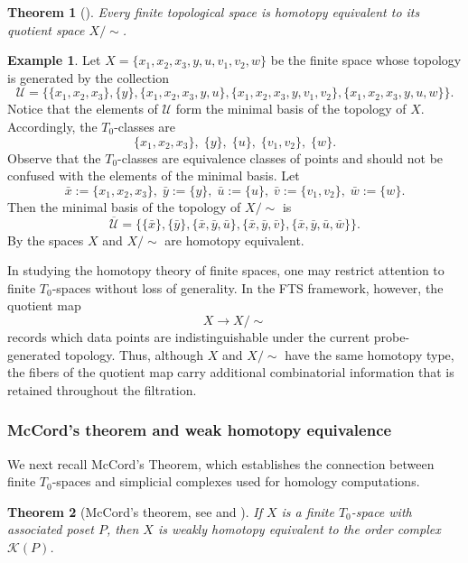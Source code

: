 \documentclass[a4paper,11pt]{article}
\newtheorem{theorem}{Theorem}[section]
\theoremstyle{definition}
\newtheorem{example}[example]{Example}
\theoremstyle{remark}
\begin{document}
\begin{theorem}[{\cite[Proposition~1.3.1]{Bar11}}]\label{thm:t0_quotient}
Every finite topological space is homotopy equivalent to its quotient space $X/{\sim}$.
\end{theorem}

\begin{example}\label{ex:t0_quotient}
  Let $X=\{x_1,x_2,x_3,y,u,v_1,v_2,w\}$ be the finite space whose topology is generated by the collection
  $$ \mathcal{U}=\{\{x_1,x_2,x_3\}, \{y\}, \{x_1,x_2,x_3,y,u\}, \{x_1,x_2,x_3,y,v_1,v_2\}, \{x_1,x_2,x_3,y,u,w\}\}. $$
  Notice that the elements of $\mathcal{U}$ form the minimal basis of the topology of $X$. Accordingly, the $T_0$-classes are
  $$ \{x_1,x_2,x_3\},\; \{y\},\; \{u\},\; \{v_1,v_2\},\; \{w\}. $$
  Observe that the $T_0$-classes are equivalence classes of points and should not be confused with the elements of the minimal basis. Let
  $$ \bar{x}:=\{x_1,x_2,x_3\},\; \bar{y}:=\{y\},\; \bar{u}:=\{u\},\; \bar{v}:=\{v_1,v_2\},\; \bar{w}:=\{w\}. $$
  Then the minimal basis of the topology of $X/{\sim}$ is
  $$ \overline{\mathcal{U}}=\{\{\bar{x}\}, \{\bar{y}\}, \{\bar{x},\bar{y},\bar{u}\}, \{\bar{x},\bar{y},\bar{v}\}, \{\bar{x},\bar{y},\bar{u},\bar{w}\}\}. $$
  By  the spaces $X$ and $X/{\sim}$ are homotopy equivalent.
\end{example}

In studying the homotopy theory of finite spaces, one may restrict attention to finite $T_0$-spaces without loss of generality. In the FTS framework, however, the quotient map
$$ X\longrightarrow X/{\sim} $$
records which data points are indistinguishable under the current probe-generated topology. Thus, although $X$ and $X/{\sim}$ have the same homotopy type, the fibers of the quotient map carry additional combinatorial information that is retained throughout the filtration.

\subsubsection*{McCord's theorem and weak homotopy equivalence}

We next recall McCord's Theorem, which establishes the connection between finite $T_0$-spaces and simplicial complexes used for homology computations.

\begin{theorem}[McCord's theorem, see {\cite{McC66}} and {\cite[Theorem~1.4.6]{Bar11}}]\label{thm:weak}
If $X$ is a finite $T_0$-space with associated poset $P$, then $X$ is weakly homotopy equivalent to the order complex $\mathcal{K}(P)$.
\end{theorem}
\end{document}
